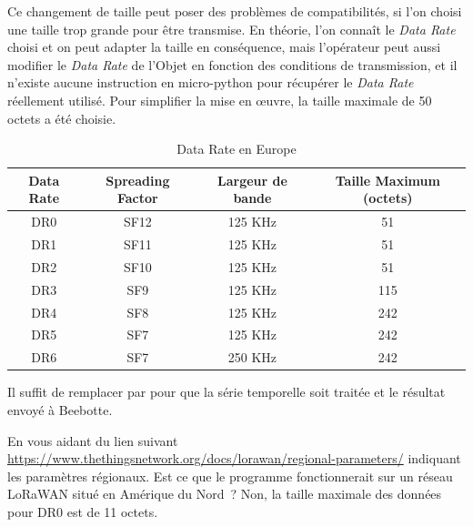 Ce changement de taille peut poser des problèmes de compatibilités, si l'on choisi une taille trop grande pour être transmise. En théorie, l'on connaît le \textit{Data Rate} choisi et on peut adapter la taille en conséquence, mais l'opérateur peut aussi modifier le \textit{Data Rate} de l'Objet en fonction des conditions de transmission, et il n'existe aucune instruction en micro-python pour récupérer le \textit{Data Rate} réellement utilisé. Pour simplifier la mise en œuvre, la taille maximale de 50 octets a été choisie. 

\begin{table}
\begin{center}
\begin{tabular}{|c||c|c||c|}
\hline
 \rowcolor{purple!10} Data Rate & Spreading Factor & Largeur de bande & Taille Maximum (octets) \\ \hline \hline
 DR0 & SF12 & 125 KHz & 51 \\ \hline
 DR1 & SF11 & 125 KHz & 51 \\ \hline
 DR2 & SF10 & 125 KHz & 51 \\ \hline
 DR3 & SF9 & 125 KHz & 115 \\ \hline
 DR4 & SF8 & 125 KHz & 242 \\ \hline
 DR5 & SF7 & 125 KHz & 242 \\ \hline
 DR6 & SF7 & 250 KHz & 242 \\ \hline
\end{tabular}
\end{center}
\caption{Data Rate en Europe}
\label{tab-data-rate}
\end{table}


Il suffit de remplacer  par  pour que la série temporelle soit traitée et le résultat envoyé à Beebotte.

{En vous aidant du lien suivant \url{https://www.thethingsnetwork.org/docs/lorawan/regional-parameters/} indiquant les paramètres régionaux. Est ce que le programme  fonctionnerait sur un réseau LoRaWAN situé en Amérique du Nord~?}
{Non, la taille maximale des données pour DR0 est de 11 octets.}
